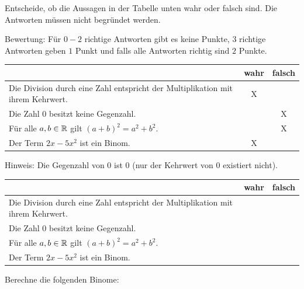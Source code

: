 \documentclass[11pt]{exam}
\begin{document}
\begin{questions}
\question[2]
Entscheide, ob die Aussagen in der Tabelle unten wahr oder falsch sind. Die Antworten müssen nicht begründet werden.\newline
\begin{small}
	Bewertung: Für $0-2$ richtige Antworten gibt es keine Punkte, $3$ richtige Antworten geben $1$ Punkt und falls alle Antworten richtig sind $2$ Punkte.
\end{small}
{\begin{solution}
		\begingroup
		\renewcommand{\arraystretch}{1.5}
		\begin{table}[H]
			\centering
			\begin{tabular}{|p{12cm}|c|c|}\hline
				& wahr & falsch\\\hline
				Die Division durch eine Zahl entspricht der Multiplikation mit ihrem Kehrwert. & X & \\\hline
				Die Zahl $0$ besitzt keine Gegenzahl. & & X \\\hline
				Für alle $a,b\in\mathbb{R}$ gilt $(a+b)^2=a^2+b^2$. & & X \\\hline
				Der Term $2x-5x^2$ ist ein Binom. & X & \\\hline
			\end{tabular}
		\end{table}
		\endgroup
		Hinweis: Die Gegenzahl von $0$ ist $0$ (nur der Kehrwert von $0$ existiert nicht).
\end{solution}}
{\begingroup
	\renewcommand{\arraystretch}{1.5}
	\begin{table}[H]
		\centering
		\begin{tabular}{|p{12cm}|c|c|}\hline
			& wahr & falsch\\\hline
			Die Division durch eine Zahl entspricht der Multiplikation mit ihrem Kehrwert. & & \\\hline
			Die Zahl $0$ besitzt keine Gegenzahl. & & \\\hline
			Für alle $a,b\in\mathbb{R}$ gilt $(a+b)^2=a^2+b^2$. & & \\\hline
			Der Term $2x-5x^2$ ist ein Binom. & & \\\hline
		\end{tabular}
	\end{table}
	\endgroup}


\question[6] %
Berechne die folgenden Binome:
\end{questions}
\end{document}
